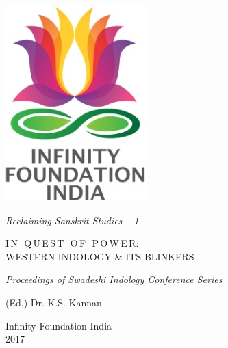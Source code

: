 \thispagestyle{empty}
\begin{center}
\includegraphics[scale=0.3]{figures/logo.png}
\bigskip

{\fontsize{10}{14}\selectfont\sl
Reclaiming Sanskrit Studies - 1}
\end{center}
\bigskip

\begin{center}
{\fontsize{20}{24}\selectfont I\,N\,\, Q\,U\,E\,S\,T\,\, O\,F\,\, P\,O\,W\,E\,R:}\\[6pt]
{\fontsize{15}{24}\selectfont WESTERN INDOLOGY \& ITS BLINKERS}
\bigskip

{\sl\small Proceedings of Swadeshi Indology Conference Series}
\bigskip
\bigskip

{\fontsize{14}{18}\selectfont 
(Ed.) Dr. K.S. Kannan\par
}
\vfill

{\fontsize{12}{14}\selectfont
Infinity Foundation India\\[4pt]
2017}
\end{center}




